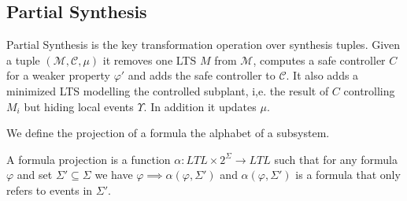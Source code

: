 \subsection{Partial Synthesis} 
\label{subsection:partial-synth}

Partial Synthesis is the key transformation operation over synthesis tuples. Given a tuple $(\mathcal{M}, \mathcal{C}, \mu)$ it removes one LTS $M$ from $\mathcal{M}$, computes a safe controller $C$ for a weaker property $\varphi'$ 
and adds the safe controller to $\mathcal{C}$. It also adds a minimized LTS modelling the controlled subplant, i,e. the result of $C$ controlling $M_i$ but hiding local events $\Upsilon$. In addition it updates $\mu$. 

We define the projection of a  formula the alphabet of a subsystem. 



\begin{definition} \label{formula-projection}
A formula projection is a function $\alpha:LTL\times 2^\Sigma\rightarrow LTL$  such that for any formula $\varphi$ and set $\Sigma' \subseteq \Sigma$ we have $\varphi \implies \alpha(\varphi, \Sigma')$ and $\alpha(\varphi, \Sigma')$ is a formula that only refers to events in $\Sigma'$.
\end{definition}

